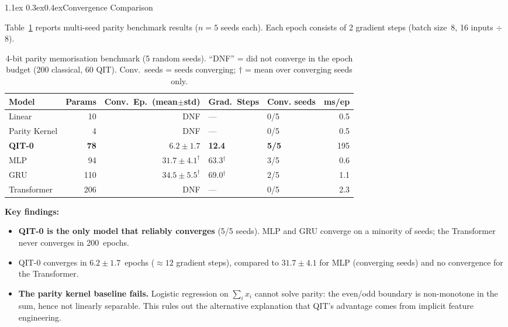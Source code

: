 \documentclass[11pt,a4paper]{article}
\makeatletter
\renewcommand\subsection{\@startsection{subsection}{2}{\z@}%
  {1.1ex \@plus 0.3ex}{0.4ex}{\normalfont\normalsize\bfseries}}
\makeatother
\begin{document}
\subsection{Convergence Comparison}
\label{sec:results_convergence}

Table~\ref{tab:results} reports multi-seed parity benchmark results ($n=5$ seeds each).
Each epoch consists of 2 gradient steps (batch size~8, 16 inputs $\div$ 8).

\begin{table}[h]
\centering
\caption{4-bit parity memorisation benchmark (5 random seeds). ``DNF'' = did not converge
         in the epoch budget (200 classical, 60 QIT). Conv.\ seeds = seeds converging;
         $\dagger$ = mean over converging seeds only.}
\label{tab:results}
\begin{tabular}{@{}lrrllr@{}}
\toprule
Model & Params & Conv.~Ep.\ (mean$\pm$std) & Grad.\ Steps & Conv. seeds & ms/ep \\
\midrule
Linear          & 10  & DNF             & —    & 0/5 &   0.5 \\
Parity Kernel   & 4   & DNF             & —    & 0/5 &   0.5 \\
\textbf{QIT-0}  & \textbf{78}  & $\mathbf{6.2\pm1.7}$ & \textbf{12.4} & \textbf{5/5} & 195 \\
MLP             & 94  & $31.7\pm4.1^\dagger$ & 63.3$^\dagger$ & 3/5 &   0.6 \\
GRU             & 110 & $34.5\pm5.5^\dagger$ & 69.0$^\dagger$ & 2/5 &   1.1 \\
Transformer     & 206 & DNF             & —    & 0/5 &   2.3 \\
\bottomrule
\end{tabular}
\end{table}

\textbf{Key findings:}
\begin{itemize}
  \item \textbf{QIT-0 is the only model that reliably converges} (5/5 seeds).
        MLP and GRU converge on a minority of seeds; the Transformer never converges
        in 200~epochs.
  \item QIT-0 converges in $6.2\pm1.7$~epochs ($\approx12$ gradient steps), compared to
        $31.7\pm4.1$ for MLP (converging seeds) and no convergence for the Transformer.
  \item \textbf{The parity kernel baseline fails.} Logistic regression on $\sum_i x_i$
        cannot solve parity: the even/odd boundary is non-monotone in the sum, hence
        not linearly separable. This rules out the alternative explanation that QIT's
        advantage comes from implicit feature engineering.
\end{itemize}
\end{document}
